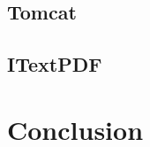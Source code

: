 \documentclass[]{usiinfbachelorproject}
\begin{document}
\subsection{Tomcat}


\subsection{ITextPDF}



\section{Conclusion} \label{conclusion}





\end{document}

